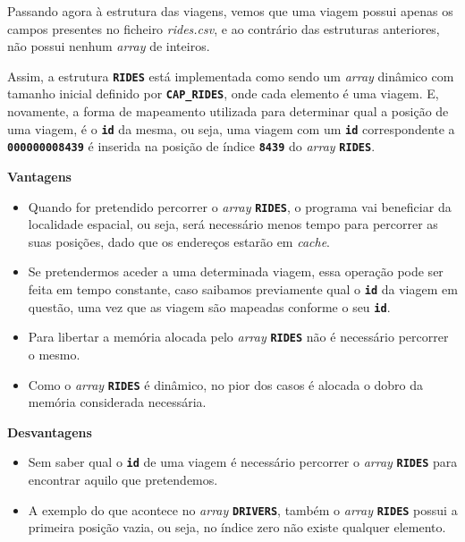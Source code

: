 \documentclass[12pt,a4paper]{report}
\begin{document}
Passando agora à estrutura das viagens, vemos que uma viagem possui apenas os campos presentes no ficheiro \textit{rides.csv}, e ao contrário das estruturas anteriores, não possui nenhum \textit{array} de inteiros.

Assim, a estrutura \textbf{\small\texttt{RIDES}} está implementada como sendo um \textit{array} dinâmico com tamanho inicial definido por \textbf{\small\texttt{CAP\_RIDES}}, onde cada elemento é uma viagem. E, novamente, a forma de mapeamento utilizada para determinar qual a posição de uma viagem, é o \textbf{\small\texttt{id}} da mesma, ou seja, uma viagem com um \textbf{\small\texttt{id}} correspondente a \textbf{\small\texttt{000000008439}} é inserida na posição de índice \textbf{\small\texttt{8439}} do \textit{array} \textbf{\small\texttt{RIDES}}.

\normalsize\textbf{Vantagens}
\begin{itemize}
   
    \item Quando for pretendido percorrer o \textit{array} \textbf{\small\texttt{RIDES}}, o programa vai beneficiar da localidade espacial, ou seja, será necessário menos tempo para percorrer as suas posições, dado que os endereços estarão em \textit{cache}.
    
    \item Se pretendermos aceder a uma determinada viagem, essa operação pode ser feita em tempo constante, caso saibamos previamente qual o \textbf{\small\texttt{id}} da viagem em questão, uma vez que as viagem são mapeadas conforme o seu \textbf{\small\texttt{id}}.

    \item Para libertar a memória alocada pelo \textit{array} \textbf{\small\texttt{RIDES}} não é necessário percorrer o mesmo.

    \item Como o \textit{array} \textbf{\small\texttt{RIDES}} é dinâmico, no pior dos casos é alocada o dobro da memória considerada necessária.
\end{itemize}

\pagebreak
\normalsize\textbf{Desvantagens}
\begin{itemize}
    \item Sem saber qual o \textbf{\small\texttt{id}} de uma viagem é necessário percorrer o \textit{array} \textbf{\small\texttt{RIDES}} para encontrar aquilo que pretendemos.
    
    \item A exemplo do que acontece no \textit{array} \textbf{\small\texttt{DRIVERS}}, também o \textit{array} \textbf{\small\texttt{RIDES}} possui a primeira posição vazia, ou seja, no índice zero não existe qualquer elemento.
\end{itemize}
\end{document}
